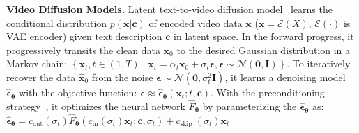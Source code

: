 \noindent \textbf{Video Diffusion Models.} Latent text-to-video diffusion model~\citep{ho2022imagen,ho2022video,videoworldsimulators2024,chen2023videocrafter1,blattmann2023stable} learns the conditional distribution $p(\mathbf{x}|\mathbf{c})$ of encoded video data $\mathbf{x}$ ($\mathbf{x}=\mathcal{E}(X)$, $\mathcal{E}(\cdot)$ is VAE encoder) given text description $\mathbf{c}$ in latent space. In the forward progress, it progressively transits the clean data $\mathbf{x}_{0}$ to the desired Gaussian distribution in a Markov chain: $\left\{\mathbf{x}_t, t \in(1, T) \mid \mathbf{x}_t=\alpha_t \mathbf{x}_0+\sigma_t \boldsymbol{\epsilon}, \boldsymbol{\epsilon} \sim \mathcal{N}(\mathbf{0}, \mathbf{I}) \right\}$. 
To iteratively recover the data $\hat{\mathbf{x}}_{0}$ from the noise $\boldsymbol{\epsilon} \sim \mathcal{N}\left(\mathbf{0}, \sigma_{t}^2 \mathbf{I}\right)$, it learns a denoising model $\hat{\boldsymbol{\epsilon}}_{\boldsymbol{\theta}}$ with the objective function: $\boldsymbol{\epsilon} \approx \hat{\boldsymbol{\epsilon}}_{\boldsymbol{\theta}} \left(\mathbf{x}_t;t,\mathbf{c}\right)$. 
With the preconditioning strategy~\citep{karras2022elucidating,salimans2022progressive}, it optimizes the neural network $\hat{F}_{\boldsymbol{\theta}}$ by parameterizing the $\hat{\boldsymbol{\epsilon}}_{\boldsymbol{\theta}}$ as: $\hat{\boldsymbol{\epsilon}}_{\boldsymbol{\theta}} = c_{\text{out}}(\sigma_t) \hat{F}_{\boldsymbol{\theta}}\left(c_{\text {in}}(\sigma_t) \mathbf{x}_t ; \boldsymbol{c}, \sigma_t\right)+c_{\text {skip }}(\sigma_t) \mathbf{x}_t$. 


